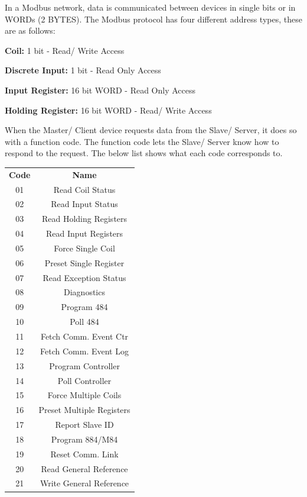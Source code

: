     In a Modbus network, data is communicated between devices in single bits or in WORDs (2 BYTES). 
    The Modbus protocol has four different address types, these are as follows:
    
    \begin{description}
        \item\textbf{Coil:} 1 bit - Read/ Write Access
        \item\textbf{Discrete Input:} 1 bit - Read Only Access
        \item\textbf{Input Register:} 16 bit WORD - Read Only Access
        \item\textbf{Holding Register:} 16 bit WORD - Read/ Write Access
    \end{description}
    
    When the Master/ Client device requests data from the Slave/ Server, it does so with a function code. The function code lets the Slave/ Server know how to respond to the request. The below list shows what each code corresponds to. 
    
    \begin{center}
        \begin{tabular}{ c c }
         \textbf{Code} & \textbf{Name}\\ 
            01 & Read Coil Status\\
            02 & Read Input Status\\
            03 & Read Holding Registers\\
            04 & Read Input Registers\\
            05 & Force Single Coil\\
            06 & Preset Single Register\\
            07 & Read Exception Status\\
            08 & Diagnostics\\
            09 & Program 484\\
            10 & Poll 484\\
            11 & Fetch Comm. Event Ctr\\
            12 & Fetch Comm. Event Log\\
            13 & Program Controller\\
            14 & Poll Controller\\
            15 & Force Multiple Coils\\
            16 & Preset Multiple Registers\\
            17 & Report Slave ID\\
            18 & Program 884/M84\\
            19 & Reset Comm. Link\\
            20 & Read General Reference\\
            21 & Write General Reference\\
        \end{tabular}\\
    \end{center}

